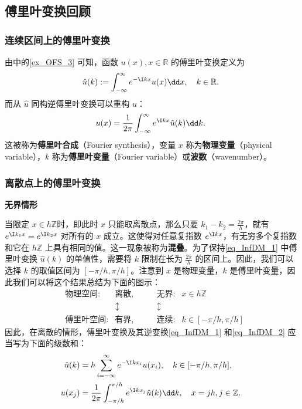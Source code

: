 

\subsection{傅里叶变换回顾}
\subsubsection{连续区间上的傅里叶变换}
由中的\autoref{ex_OFS_3} 可知，函数 $u(x),x\in\mathbb R$ 的傅里叶变换定义为
\begin{equation}\label{eq_InfDM_1}
\hat u(k):=\int_{-\infty}^{\infty} e^{-\I kx}u(x)\dd x,\quad k\in\mathbb R.~
\end{equation}
而从 $\hat u$ 同构逆傅里叶变换可以重构 $u$：
\begin{equation}\label{eq_InfDM_2}
u(x)=\frac{1}{2\pi}\int_{-\infty}^{\infty} e^{\I kx}\hat u(k)\dd k.~
\end{equation}
这被称为\textbf{傅里叶合成}（Fourier synthesis），变量 $x$ 称为\textbf{物理变量}（physical variable），$k$ 称为\textbf{傅里叶变量}（Fourier variable）或\textbf{波数}（wavenumber）。

\subsubsection{离散点上的傅里叶变换}
\textbf{无界情形}

当限定 $x\in h\mathbb Z$时，即此时 $x$ 只能取离散点，那么只要 $k_1-k_2=\frac{2\pi}{h}$，就有 $e^{\I k_1x}=e^{\I k_2x}$ 对所有的 $x$ 成立。这使得对任意复指数 $e^{\I kx}$，有无穷多个复指数和它在 $h\mathbb Z$ 上具有相同的值。这一现象被称为\textbf{混叠}。为了保持\autoref{eq_InfDM_1} 中傅里叶变换 $\hat u(k)$ 的单值性，需要将 $k$ 限制在长为 $\frac{2\pi}{h}$ 的区间上。因此，我们可以选择 $k$ 的取值区间为 $[-\pi/h,\pi/h]$。注意到 $x$ 是物理变量，$k$ 是傅里叶变量，因此我们可以将这个结果总结为下面的图示：
\begin{equation}
\begin{aligned}
&\text{物理空间:}& \text{离散},&\qquad\text{无界:} &x\in h\mathbb Z\\
&&\updownarrow&\qquad\updownarrow&\\
&\text{傅里叶空间:}& \text{有界},&\qquad\text{连续:} &k\in [-\pi/h,\pi/h]
\end{aligned}~
\end{equation}
因此，在离散的情形，傅里叶变换及其逆变换\autoref{eq_InfDM_1} 和\autoref{eq_InfDM_2} 应当写为下面的级数和：
\begin{equation}\label{eq_InfDM_3}
\begin{aligned}
\hat u(k)&=h\sum_{i=-\infty}^{\infty}e^{-\I kx_i}u(x_i),\quad k\in[-\pi/h,\pi/h],\\
u(x_j)&=\frac{1}{2\pi}\int_{-\pi/h}^{\pi/h} e^{\I kx_j}\hat u(k)\dd k,\quad x=jh,j\in \mathbb Z.
\end{aligned}~
\end{equation}

